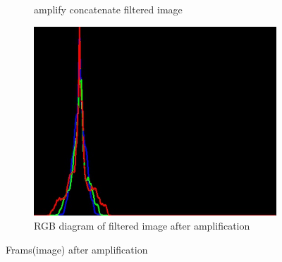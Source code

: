 \begin{figure}[!h]
\begin{subfigure}{.4\textwidth}
  \caption{amplify concatenate filtered image}
  \label{fig:sub1}
\end{subfigure}%
\begin{subfigure}{.5\textwidth}
  \centering
  \includegraphics[scale=0.5]{img/eulerian/sample/amplifyRGB}
  \caption{RGB diagram of filtered image after amplification}
  \label{fig:sub2}
\end{subfigure}
\caption{Frams(image) after amplification}
\label{fig:test}
\end{figure}


